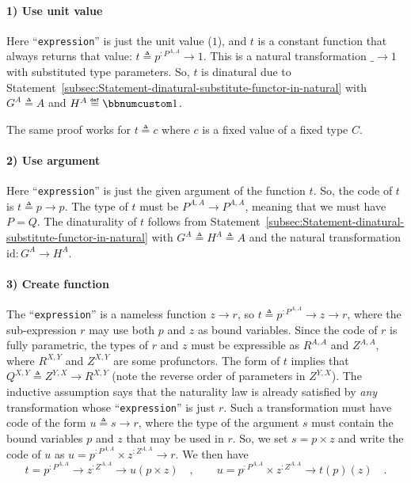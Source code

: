 \paragraph{1) Use unit value}

Here \textsf{``}\lstinline!expression!\textsf{''} is just the unit value ($1$),
and $t$ is a constant function that always returns that value: $t\triangleq p^{:P^{A,A}}\rightarrow1$.
This is a natural transformation $\_\rightarrow1$ with substituted
type parameters. So, $t$ is dinatural due to Statement~\ref{subsec:Statement-dinatural-substitute-functor-in-natural}
with $G^{A}\triangleq A$ and $H^{A}\triangleq\bbnum 1$.

The same proof works for $t\triangleq c$ where $c$ is a fixed value
of a fixed type $C$.

\paragraph{2) Use argument }

Here \textsf{``}\lstinline!expression!\textsf{''} is just the given argument of the
function $t$. So, the code of $t$ is $t\triangleq p\rightarrow p$.
The type of $t$ must be $P^{A,A}\rightarrow P^{A,A}$, meaning that
we must have $P=Q$. The dinaturality of $t$ follows from Statement~\ref{subsec:Statement-dinatural-substitute-functor-in-natural}
with $G^{A}\triangleq H^{A}\triangleq A$ and the natural transformation
$\text{id}:G^{A}\rightarrow H^{A}$.

\paragraph{3) Create function}

The \textsf{``}\lstinline!expression!\textsf{''} is a nameless function $z\rightarrow r$,
so $t\triangleq p^{:P^{A,A}}\rightarrow z\rightarrow r$, where the
sub-expression $r$ may use both $p$ and $z$ as bound variables.
Since the code of $r$ is fully parametric, the types of $r$ and
$z$ must be expressible as $R^{A,A}$ and $Z^{A,A}$, where $R^{X,Y}$
and $Z^{X,Y}$ are some profunctors. The form of $t$ implies that
$Q^{X,Y}\triangleq Z^{Y,X}\rightarrow R^{X,Y}$ (note the reverse
order of parameters in $Z^{Y,X}$). The inductive assumption says
that the naturality law is already satisfied by \emph{any} transformation
whose \textsf{``}\lstinline!expression!\textsf{''} is just $r$. Such a transformation
must have code of the form $u\triangleq s\rightarrow r$, where the
type of the argument $s$ must contain the bound variables $p$ and
$z$ that may be used in $r$. So, we set $s=p\times z$ and write
the code of $u$ as $u=p^{:P^{A,A}}\times z^{:Z^{A,A}}\rightarrow r$.
We then have
\begin{equation}
t=p^{:P^{A,A}}\rightarrow z^{:Z^{A,A}}\rightarrow u(p\times z)\quad,\quad\quad u=p^{:P^{A,A}}\times z^{:Z^{A,A}}\rightarrow t(p)(z)\quad.\label{eq:dinaturality-u-function-type-derivation0-2}
\end{equation}

